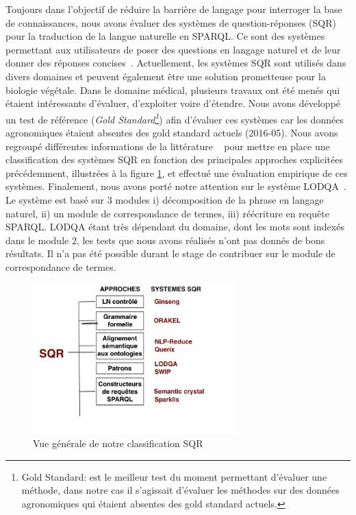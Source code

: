 Toujours dans l'objectif de réduire la barrière de langage pour interroger la base de connaissances, nous avons évaluer des systèmes de question-réponses (SQR) pour la traduction de la langue naturelle en SPARQL. Ce sont des systèmes permettant aux utilisateurs de poser des questions en langage naturel et de leur donner des réponses concises~\cite{HirschmanGaizauskas2001,Lopez-al2011}. Actuellement, les systèmes SQR sont utilisés dans divers domaines et peuvent également être une solution prometteuse pour la biologie végétale. Dans le domaine médical, plusieurs travaux ont été menés qui étaient intéressants d’évaluer, d'exploiter voire d’étendre. Nous avons développé un test de référence (\textit{Gold Standard\footnote{Gold Standard: est le meilleur test du moment permettant d'évaluer une méthode, dans notre cas il s'agissait d'évaluer les méthodes sur des données agronomiques qui étaient absentes des gold standard actuels.}}) afin d'évaluer ces systèmes car les données agronomiques étaient absentes des gold standard actuels (2016-05). Nous avons regroupé différentes informations de la littérature ~\cite{HirschmanGaizauskas2001,Lopez-al2011,Moldovan-al2002,NevesLeser2015} pour mettre en place une classification des systèmes SQR en fonction des principales approches explicitées précédemment, illustrées à la figure \ref{SQR}, et effectué une évaluation empirique de ces systèmes. Finalement, nous avons porté notre attention sur le système LODQA~\cite{KimCohen2013}. Le système est basé sur 3 modules i) décomposition de la phrase en langage naturel, ii) un module de correspondance de termes, iii) réécriture en requête SPARQL. LODQA étant très dépendant du domaine, dont les mots sont indexés dans le module 2, les tests que nous avons réalisés n'ont pas donnés de bons résultats. Il n'a pas été possible durant le stage de contribuer sur le module de correspondance de termes.

\begin{figure}[!ht]
\begin{center}
	\includegraphics[width=0.70\textwidth]{Figures/classificationSQR.png}
\end{center}
\caption{\label{SQR} Vue générale de notre classification SQR}
\end{figure}

